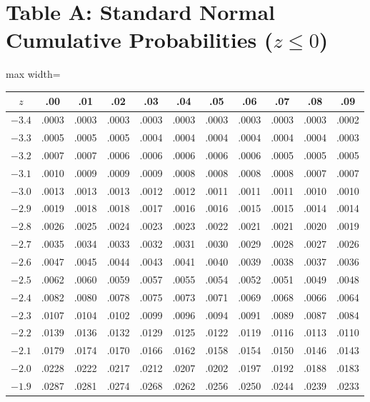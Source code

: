 \section{Table A: Standard Normal Cumulative Probabilities ($z \le 0$)}
\begin{center}
\small
\begin{adjustbox}{max width=\linewidth}
\begin{tabular}{ccccccccccc}
\toprule
$z$ & .00 & .01 & .02 & .03 & .04 & .05 & .06 & .07 & .08 & .09 \\
\midrule
$-3.4$ & .0003 & .0003 & .0003 & .0003 & .0003 & .0003 & .0003 & .0003 & .0003 & .0002 \\
$-3.3$ & .0005 & .0005 & .0005 & .0004 & .0004 & .0004 & .0004 & .0004 & .0004 & .0003 \\
$-3.2$ & .0007 & .0007 & .0006 & .0006 & .0006 & .0006 & .0006 & .0005 & .0005 & .0005 \\
$-3.1$ & .0010 & .0009 & .0009 & .0009 & .0008 & .0008 & .0008 & .0008 & .0007 & .0007 \\
$-3.0$ & .0013 & .0013 & .0013 & .0012 & .0012 & .0011 & .0011 & .0011 & .0010 & .0010 \\
\midrule
$-2.9$ & .0019 & .0018 & .0018 & .0017 & .0016 & .0016 & .0015 & .0015 & .0014 & .0014 \\
$-2.8$ & .0026 & .0025 & .0024 & .0023 & .0023 & .0022 & .0021 & .0021 & .0020 & .0019 \\
$-2.7$ & .0035 & .0034 & .0033 & .0032 & .0031 & .0030 & .0029 & .0028 & .0027 & .0026 \\
$-2.6$ & .0047 & .0045 & .0044 & .0043 & .0041 & .0040 & .0039 & .0038 & .0037 & .0036 \\
$-2.5$ & .0062 & .0060 & .0059 & .0057 & .0055 & .0054 & .0052 & .0051 & .0049 & .0048 \\
\midrule
$-2.4$ & .0082 & .0080 & .0078 & .0075 & .0073 & .0071 & .0069 & .0068 & .0066 & .0064 \\
$-2.3$ & .0107 & .0104 & .0102 & .0099 & .0096 & .0094 & .0091 & .0089 & .0087 & .0084 \\
$-2.2$ & .0139 & .0136 & .0132 & .0129 & .0125 & .0122 & .0119 & .0116 & .0113 & .0110 \\
$-2.1$ & .0179 & .0174 & .0170 & .0166 & .0162 & .0158 & .0154 & .0150 & .0146 & .0143 \\
$-2.0$ & .0228 & .0222 & .0217 & .0212 & .0207 & .0202 & .0197 & .0192 & .0188 & .0183 \\
\midrule
$-1.9$ & .0287 & .0281 & .0274 & .0268 & .0262 & .0256 & .0250 & .0244 & .0239 & .0233 \\

\end{tabular}
\end{adjustbox}
\end{center}
